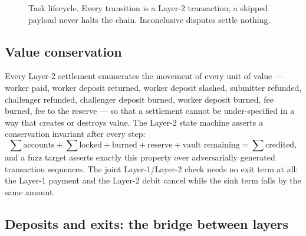 \documentclass{article}
\begin{document}
\begin{figure}[htbp]
\centering
{}
\caption{Task lifecycle. Every transition is a Layer-2 transaction; a skipped
payload never halts the chain. Inconclusive disputes settle nothing.}
\label{fig:taskflow}
\end{figure}

\subsection{Value conservation}

Every Layer-2 settlement enumerates the movement of every unit of value ---
worker paid, worker deposit returned, worker deposit slashed, submitter
refunded, challenger refunded, challenger deposit burned, worker deposit
burned, fee burned, fee to the reserve --- so that a settlement cannot be
under-specified in a way that creates or destroys value. The Layer-2 state
machine asserts a conservation invariant after every step:
\begin{equation}
\sum \text{accounts} + \sum \text{locked} + \text{burned} + \text{reserve}
+ \text{vault remaining} = \sum \text{credited} ,
\label{eq:conservation}
\end{equation}
and a fuzz target asserts exactly this property over adversarially generated
transaction sequences. The joint Layer-1/Layer-2 check needs no exit term at
all: the Layer-1 payment and the Layer-2 debit cancel while the sink term falls
by the same amount.

\subsection{Deposits and exits: the bridge between layers}
\label{sec:exits}
\end{document}
